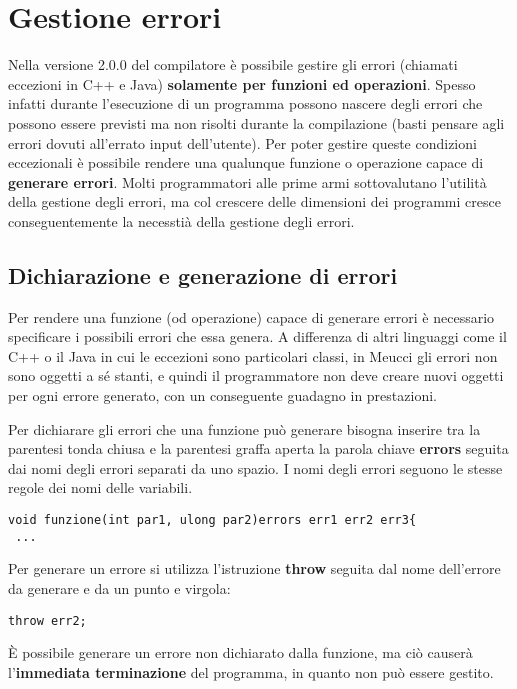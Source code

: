 \documentclass[10pt]{book}%
\newcommand{\e}{\`{e} }
\newcommand{\ac}[1]{\`{#1}}
\renewcommand{\emph}[1]{\textbf{#1}}
\newenvironment{codeenv}{
\begin{mdframed}[backgroundcolor=black!20,topline=false,leftline=false,rightline=false,bottomline=false]
}
{\end{mdframed}}
\begin{document}
\section{Gestione errori}
Nella versione 2.0.0 del compilatore \e possibile gestire gli errori (chiamati eccezioni in C++ e Java) \emph{solamente per funzioni ed operazioni}. Spesso infatti durante l'esecuzione di un programma possono nascere degli errori che possono essere previsti ma non risolti durante la compilazione (basti pensare agli errori dovuti  all'errato input dell'utente). Per poter gestire queste condizioni eccezionali \e possibile rendere una qualunque funzione o operazione capace di \emph{generare errori}. Molti programmatori alle prime armi sottovalutano l'utilit\ac a della gestione degli errori, ma col crescere delle dimensioni dei programmi cresce conseguentemente la necessti\ac a della gestione degli errori.

\subsection{Dichiarazione e generazione di errori}
Per rendere una funzione (od operazione) capace di generare errori \e necessario specificare i possibili errori che essa genera. A differenza di altri linguaggi come il C++ o il Java in cui le eccezioni sono particolari classi, in Meucci gli errori non sono oggetti a s\'e stanti, e quindi il programmatore non deve creare nuovi oggetti per ogni errore generato, con un conseguente guadagno in prestazioni.

Per dichiarare gli errori che una funzione pu\ac o generare bisogna inserire tra la parentesi tonda chiusa e la parentesi graffa aperta la parola chiave \emph{errors} seguita dai nomi degli errori separati da uno spazio. I nomi degli errori seguono le stesse regole dei nomi delle variabili.
\begin{codeenv}
\begin{verbatim}
void funzione(int par1, ulong par2)errors err1 err2 err3{
 ...
\end{verbatim}
\end{codeenv}

Per generare un errore si utilizza l'istruzione \emph{throw} seguita dal nome dell'errore da generare e da un punto e virgola:

\begin{codeenv}
\begin{verbatim}
throw err2;
\end{verbatim}
\end{codeenv}
\ac E possibile generare un errore non dichiarato dalla funzione, ma ci\ac o causer\ac a l'\emph{immediata terminazione} del programma, in quanto non può essere gestito.
\end{document}
